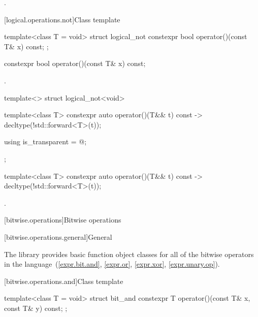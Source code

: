 \begin{itemdescr}
\pnum
\returns
{}.
\end{itemdescr}

[logical.operations.not]{Class template }

%
\begin{itemdecl}
template<class T = void> struct logical_not {
  constexpr bool operator()(const T& x) const;
};
\end{itemdecl}

%
\begin{itemdecl}
constexpr bool operator()(const T& x) const;
\end{itemdecl}

\begin{itemdescr}
\pnum
\returns
{}.
\end{itemdescr}

%
\begin{itemdecl}
template<> struct logical_not<void> {
  template<class T> constexpr auto operator()(T&& t) const
    -> decltype(!std::forward<T>(t));

  using is_transparent = @\unspec@;
};
\end{itemdecl}

%
\begin{itemdecl}
template<class T> constexpr auto operator()(T&& t) const
    -> decltype(!std::forward<T>(t));
\end{itemdecl}

\begin{itemdescr}
\pnum
\returns
{}.
\end{itemdescr}


[bitwise.operations]{Bitwise operations}

[bitwise.operations.general]{General}

\pnum
The library provides basic function object classes for all of the bitwise
operators in the language~(\ref{expr.bit.and}, \ref{expr.or},
\ref{expr.xor}, \ref{expr.unary.op}).

[bitwise.operations.and]{Class template }

%
\begin{itemdecl}
template<class T = void> struct bit_and {
  constexpr T operator()(const T& x, const T& y) const;
};
\end{itemdecl}


